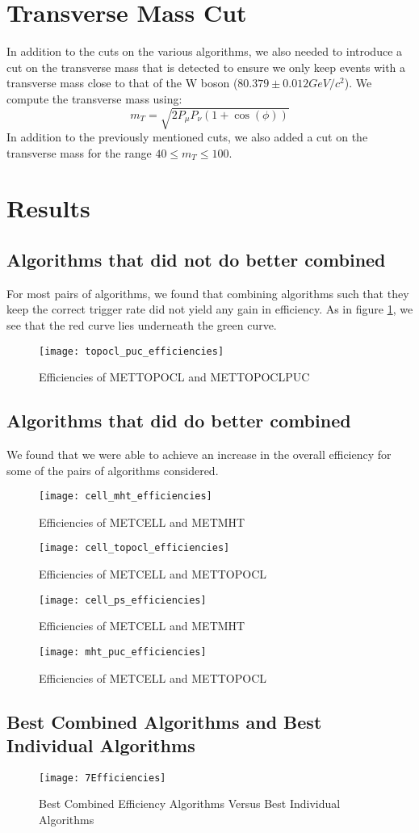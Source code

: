 \section{Transverse Mass Cut}
In addition to the cuts on the various algorithms, we also needed to introduce a cut on the transverse mass that is detected to ensure we only keep events with a transverse mass close to that of the W boson ($80.379\pm 0.012 GeV/c^2$). 
We compute the transverse mass using:
$$m_{T}=\sqrt{2P_{\mu}P_{\nu}(1+\cos{(\phi)})}$$
In addition to the previously mentioned cuts, we also added a cut on the transverse mass for the range $40 \leq m_{T} \leq 100$. 
\pagebreak
\section{Results}
\subsection{Algorithms that did not do better combined}
For most pairs of algorithms, we found that combining algorithms such that they keep the correct trigger rate did not yield any gain in efficiency. As in figure \ref{no_gain_efficiency}, we see that the red curve lies underneath the green curve. 
\begin{figure}[h]
        \centering
        \texttt{[image: topocl\_puc\_efficiencies]}
        \caption{Efficiencies of METTOPOCL and METTOPOCLPUC}
        \label{no_gain_efficiency}
\end{figure}
\clearpage
\subsection{Algorithms that did do better combined}
We found that we were able to achieve an increase in the overall efficiency for some of the pairs of algorithms considered. 
\begin{figure}[h]
        \centering
        \texttt{[image: cell\_mht\_efficiencies]}
        \caption{Efficiencies of METCELL and METMHT}
\end{figure}
\begin{figure}[h]
        \centering
        \texttt{[image: cell\_topocl\_efficiencies]}
        \caption{Efficiencies of METCELL and METTOPOCL}
\end{figure}
\begin{figure}[h]
        \centering
        \texttt{[image: cell\_ps\_efficiencies]}
        \caption{Efficiencies of METCELL and METMHT}
\end{figure}
\begin{figure}[h]
        \centering
        \texttt{[image: mht\_puc\_efficiencies]}
        \caption{Efficiencies of METCELL and METTOPOCL}
\end{figure}
\clearpage
\subsection{Best Combined Algorithms and Best Individual Algorithms}
\begin{figure}[h]
        \centering
        \texttt{[image: 7Efficiencies]}
        \caption{Best Combined Efficiency Algorithms Versus Best Individual Algorithms}
\end{figure}
\clearpage
